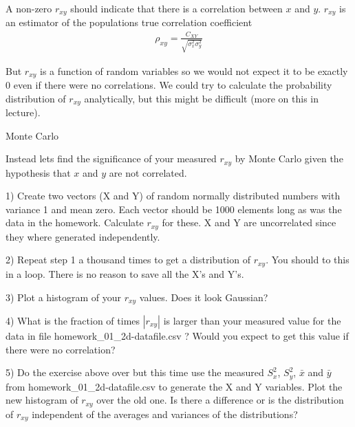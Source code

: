 \documentclass[11pt]{beamer}
\begin{document}
\begin{frame}
A non-zero $r_{xy}$ should indicate that there is a correlation between $x$ and $y$.
$r_{xy}$ is an estimator of the populations true correlation coefficient
\begin{align}
\rho_{xy} = \frac{C_{XY}}{\sqrt{\sigma^2_x \sigma_y^2} }
\end{align}

But $r_{xy}$ is a function of random variables so we would not expect it to be exactly 0 
even if there were no correlations.  We could try to calculate the probability distribution of 
$r_{xy}$ analytically, but this might be difficult (more on this in lecture).
\end{frame}
\begin{frame}
{\large Monte Carlo}

Instead lets find the significance of your measured $r_{xy}$ by Monte Carlo given the hypothesis that 
$x$ and $y$ are not correlated.

\vspace{1cm}
1) Create two vectors (X and Y) of random normally distributed numbers with variance 1 and mean zero.  Each vector should be 1000 elements long as was the data in the homework.  Calculate $r_{xy}$ for these.  X and Y 
are uncorrelated since they where generated independently.

\vspace{0.9cm}
2) Repeat step 1 a thousand times to get a distribution of $r_{xy}$.  You should to this in a loop.  There is no reason to save all the X's and Y's.

\vspace{0.9cm}
3) Plot a histogram of your  $r_{xy}$ values.  Does it look Gaussian?
\end{frame}
\begin{frame}
4) What is the fraction of times $|r_{xy}|$ is larger than your measured value for the data in file homework\_01\_2d-datafile.csv ?  Would you expect to get this value if there were no correlation?

\vspace{0.9cm}

5) Do the exercise above over but this time use the measured $S^2_x$, $S^2_y$, $\bar{x}$ and $\bar{y}$ from homework\_01\_2d-datafile.csv  to generate the  X and Y variables.   Plot the new histogram of $r_{xy}$ over the old one.   Is there a difference or is the distribution of $r_{xy}$ independent of the averages and variances of the distributions?
\end{frame}
\end{document}
